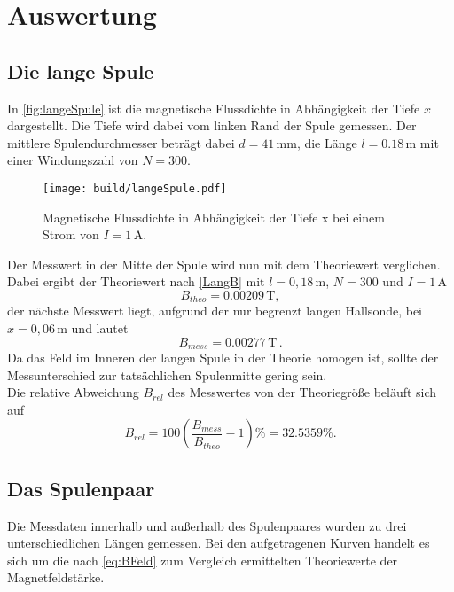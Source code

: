 \section{Auswertung}
\label{sec:Auswertung}

\subsection{Die lange Spule}
\label{sec:langeSpule}
In \autoref{fig:langeSpule} ist die magnetische Flussdichte in Abhängigkeit der Tiefe $x$ dargestellt. Die Tiefe
wird dabei vom linken Rand der Spule gemessen. Der mittlere Spulendurchmesser beträgt dabei $d=41 \, \unit{\milli\meter}$, 
die Länge $l=0.18 \, \unit{\meter}$ mit einer Windungszahl von $N=300$.
\begin{figure}[H]
    \centering
    \texttt{[image: build/langeSpule.pdf]}
    \caption{Magnetische Flussdichte in Abhängigkeit der Tiefe x bei einem Strom von $I= 1 \, \unit{\ampere}$.}
    \label{fig:langeSpule}
  \end{figure}

Der Messwert in der Mitte der Spule wird nun mit dem Theoriewert verglichen.
Dabei ergibt der Theoriewert nach \eqref{LangB} mit $l=0,18 \, \unit{\meter}$, $N=300$ und $I= 1\, \unit{\ampere}$
\begin{equation*}
  B_{theo}= 0.00209 \, \unit{\tesla},
\end{equation*}
der nächste Messwert liegt, aufgrund der nur begrenzt langen Hallsonde, bei $x=0,06\, \unit{\meter}$ und lautet
\begin{equation*}
  B_{mess} = 0.00277 \, \unit{\tesla}\,.
\end{equation*}
Da das Feld im Inneren der langen Spule in der Theorie homogen ist, sollte der Messunterschied zur tatsächlichen Spulenmitte
gering sein. \\

Die relative Abweichung $B_{rel}$ des Messwertes von der Theoriegröße beläuft sich auf
\begin{equation*}
  B_{rel} = 100 (\dfrac{B_{mess}}{B_{theo}}-1)\% = 32.5359 \%.
\end{equation*}

\newpage

\subsection{Das Spulenpaar}
\label{sec:Spulenpaar}
Die Messdaten innerhalb und außerhalb des Spulenpaares wurden zu drei unterschiedlichen Längen gemessen. 
Bei den aufgetragenen Kurven handelt es sich um die nach \eqref{eq:BFeld} zum Vergleich ermittelten Theoriewerte
der Magnetfeldstärke. \\

